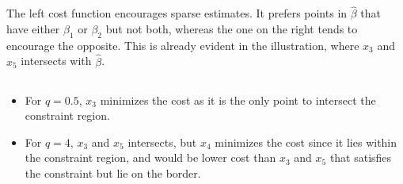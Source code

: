 \documentclass[11pt]{scrartcl}
\begin{document}
\section{}

\subsection{}

The left cost function encourages sparse estimates. It prefers points in $\hat{\beta}$ that have either $\beta_1$ or $\beta_2$ but not both, whereas the one on the right tends to encourage the opposite. This is already evident in the illustration, where $x_3$ and $x_5$ intersects with $\hat{\beta}$.

\subsection{}

\begin{itemize}
\item For $q=0.5$, $x_3$ minimizes the cost as it is the only point to intersect the constraint region.
\item For $q=4$, $x_3$ and $x_5$ intersects, but $x_4$ minimizes the cost since it lies within the constraint region, and would be lower cost than $x_3$ and $x_5$ that satisfies the constraint but lie on the border.
\end{itemize}
\end{document}
